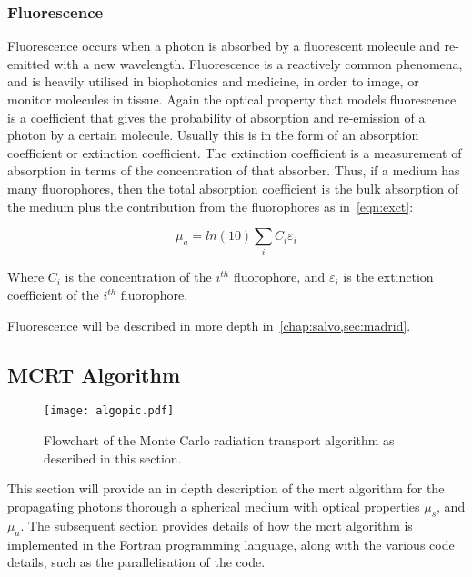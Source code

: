 \medskip

\subsubsection*{Fluorescence}



Fluorescence occurs when a photon is absorbed by a fluorescent molecule and re-emitted with a new wavelength. Fluorescence	is a reactively common phenomena, and is heavily utilised in biophotonics and medicine, in order to image, or monitor molecules in tissue. Again the optical property that models fluorescence is a coefficient that gives the probability of absorption and re-emission of a photon by a certain molecule. Usually this is in the form of an absorption coefficient or extinction coefficient. The extinction coefficient is a measurement of absorption in terms of the concentration of that absorber. Thus, if a medium has many fluorophores, then the total absorption coefficient is the bulk absorption of the medium plus the contribution from the fluorophores as in~\cref{eqn:exct}:

\begin{equation}
\mu_a=ln(10) \sum_i C_i \varepsilon_i
\label{eqn:exct}	
\end{equation}

Where $C_i$ is the concentration of the $i^{th}$ fluorophore, and $\varepsilon_i$ is the extinction coefficient of the $i^{th}$ fluorophore.

Fluorescence will be described in more depth in~\cref{chap:salvo,sec:madrid}.
\newpage
\subsection{MCRT Algorithm}\label{sec:algorithmMCRT}

\begin{wrapfigure}{r}{.45\textwidth}
\centering
\texttt{[image: algopic.pdf]}
\caption{Flowchart of the Monte Carlo radiation transport algorithm as described in this section.}
\label{fig:algo}
\vspace{-61pt}
\end{wrapfigure}
\FloatBarrier

This section will provide an in depth description of the \gls*{mcrt} algorithm for the propagating photons thorough a spherical medium with optical properties $\mu_s$, and $\mu_a$. The subsequent section provides details of how the \gls*{mcrt} algorithm is implemented in the Fortran programming language, along with the various code details, such as the parallelisation of the code.

